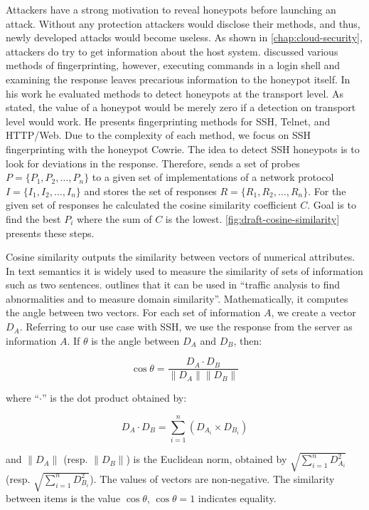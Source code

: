 Attackers have a strong motivation to reveal honeypots before launching an attack.
Without any protection attackers would disclose their methods, and thus, newly developed attacks would become useless.
As shown in \autoref{chap:cloud-security}, attackers do try to get information about the host system.
\citet{vetterl2020} discussed various methods of fingerprinting, however, executing commands in a login shell and examining the response leaves precarious information to the honeypot itself.
In his work he evaluated methods to detect honeypots at the transport level.
As stated, the value of a honeypot would be merely zero if a detection on transport level would work.
He presents fingerprinting methods for SSH, Telnet, and HTTP/Web.
Due to the complexity of each method, we focus on SSH fingerprinting with the honeypot Cowrie.
The idea to detect SSH honeypots is to look for deviations in the response.
Therefore, \citet{vetterl2020} sends a set of probes $P = \{P_1, P_2, \dots, P_n\}$ to a given set of implementations of a network protocol $I = \{I_1, I_2, \dots, I_n\}$ and stores the set of responses $R = \{R_1, R_2, \dots, R_n\}$.
For the given set of responses he calculated the cosine similarity coefficient $C$.
Goal is to find the best $P_i$ where the sum of $C$ is the lowest.
\autoref{fig:draft-cosine-similarity} presents these steps.

Cosine similarity outputs the similarity between vectors of numerical attributes.
In text semantics it is widely used to measure the similarity of sets of information such as two sentences.
\citet{vetterl2020} outlines that it can be used in \enquote{traffic analysis to find abnormalities and to measure domain similarity}.
Mathematically, it computes the angle between two vectors.
For each set of information $A$, we create a vector $D_A$.
Referring to our use case with SSH, we use the response from the server as information $A$.
If $\theta$ is the angle between $D_A$ and $D_B$, then:

\begin{equation} \label{eq:cosine-similarity}
    \cos \theta = \frac{D_A \cdot D_B}{\|D_A\| \|D_B\|}
\end{equation}

where \enquote{$\cdot$} is the dot product obtained by:

\begin{equation}
    D_A \cdot D_B = \sum_{i=1}^{n} (D_{A_i} \times D_{B_i})
\end{equation}

and $\|D_A\|$ (resp. $\|D_B\|$) is the Euclidean norm, obtained by $\sqrt{\sum_{i=1}^{n} D_{A_i}^2}$ (resp. $\sqrt{\sum_{i=1}^{n} D_{B_i}^2}$).
The values of vectors are non-negative. The similarity between items is the value $\cos \theta$, $\cos \theta = 1$ indicates equality.

